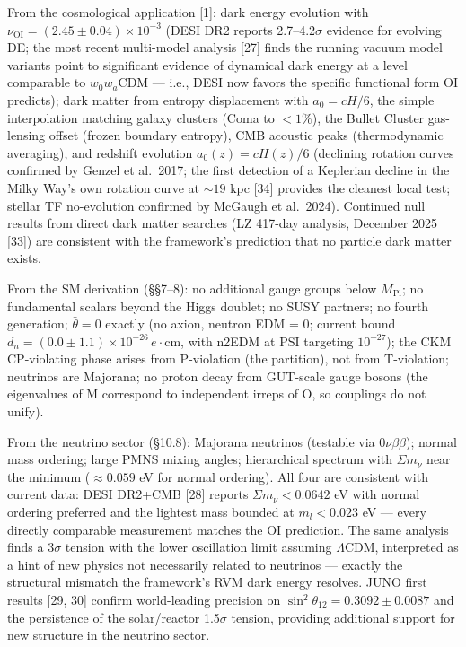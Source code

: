 \documentclass[
  11pt,
]{article}
\begin{document}
From the cosmological application {[}1{]}: dark energy evolution with
\(\nu_{\text{OI}} = (2.45 \pm 0.04) \times 10^{-3}\) (DESI DR2 reports
2.7--4.2\(\sigma\) evidence for evolving DE; the most recent multi-model
analysis {[}27{]} finds the running vacuum model variants point to
significant evidence of dynamical dark energy at a level comparable to
\(w_0w_a\)CDM --- i.e., DESI now favors the specific functional form OI
predicts); dark matter from entropy displacement with \(a_0 = cH/6\),
the simple interpolation matching galaxy clusters (Coma to \(< 1\%\)),
the Bullet Cluster gas-lensing offset (frozen boundary entropy), CMB
acoustic peaks (thermodynamic averaging), and redshift evolution
\(a_0(z) = cH(z)/6\) (declining rotation curves confirmed by Genzel et
al.~2017; the first detection of a Keplerian decline in the Milky Way's
own rotation curve at \(\sim 19\) kpc {[}34{]} provides the cleanest
local test; stellar TF no-evolution confirmed by McGaugh et al.~2024).
Continued null results from direct dark matter searches (LZ 417-day
analysis, December 2025 {[}33{]}) are consistent with the framework's
prediction that no particle dark matter exists.

From the SM derivation (§§7--8): no additional gauge groups below
\(M_{\text{Pl}}\); no fundamental scalars beyond the Higgs doublet; no
SUSY partners; no fourth generation; \(\bar{\theta} = 0\) exactly (no
axion, neutron EDM = 0; current bound
\(d_n = (0.0 \pm 1.1) \times 10^{-26}\,e\cdot\text{cm}\), with n2EDM at
PSI targeting \(10^{-27}\)); the CKM CP-violating phase arises from
P-violation (the partition), not from T-violation; neutrinos are
Majorana; no proton decay from GUT-scale gauge bosons (the eigenvalues
of M correspond to independent irreps of O, so couplings do not unify).

From the neutrino sector (§10.8): Majorana neutrinos (testable via
\(0\nu\beta\beta\)); normal mass ordering; large PMNS mixing angles;
hierarchical spectrum with \(\Sigma m_\nu\) near the minimum
(\(\approx 0.059\) eV for normal ordering). All four are consistent with
current data: DESI DR2+CMB {[}28{]} reports \(\Sigma m_\nu < 0.0642\) eV
with normal ordering preferred and the lightest mass bounded at
\(m_l < 0.023\) eV --- every directly comparable measurement matches the
OI prediction. The same analysis finds a \(3\sigma\) tension with the
lower oscillation limit assuming \(\Lambda\)CDM, interpreted as a hint
of new physics not necessarily related to neutrinos --- exactly the
structural mismatch the framework's RVM dark energy resolves. JUNO first
results {[}29, 30{]} confirm world-leading precision on
\(\sin^2\theta_{12} = 0.3092 \pm 0.0087\) and the persistence of the
solar/reactor 1.5\(\sigma\) tension, providing additional support for
new structure in the neutrino sector.
\end{document}
